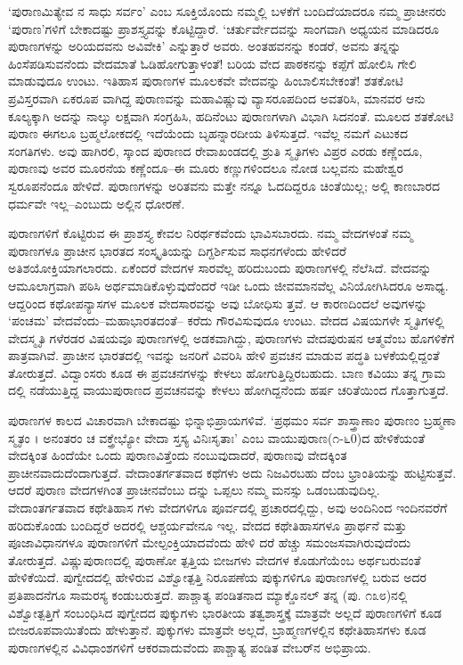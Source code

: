 ‘ಪುರಾಣಮಿತ್ಯೇವ ನ ಸಾಧು ಸರ್ವಂ’ ಎಂಬ ಸೂಕ್ತಿಯೊಂದು ನಮ್ಮಲ್ಲಿ ಬಳಕೆಗೆ ಬಂದಿದೆಯಾದರೂ ನಮ್ಮ ಪ್ರಾಚೀನರು ‘ಪುರಾಣ’ಗಳಿಗೆ ಬೇಕಾದಷ್ಟು ಪ್ರಾಶಸ್ತ್ಯವನ್ನು ಕೊಟ್ಟಿದ್ದಾರೆ. ‘ಚರ್ತುರ್ವೇದವನ್ನು ಸಾಂಗವಾಗಿ ಅಧ್ಯಯನ ಮಾಡಿದರೂ ಪುರಾಣಗಳನ್ನು ಅರಿಯದವನು ಅವಿವೇಕಿ’ ಎನ್ನುತ್ತಾರೆ ಅವರು. ಅಂತಹವನನ್ನು ಕಂಡರೆ, ಅವನು ತನ್ನನ್ನು ಹಿಂಸೆಪಡಿಸುವನೆಂದು ವೇದಮಾತೆ ಓಡಿಹೋಗುತ್ತಾಳಂತೆ! ಬರಿಯ ವೇದ ಪಾಠಕನನ್ನು ಕಪ್ಪೆಗೆ ಹೋಲಿಸಿ ಗೇಲಿ ಮಾಡುವುದೂ ಉಂಟು. ಇತಿಹಾಸ ಪುರಾಣಗಳ ಮೂಲಕವೇ ವೇದವನ್ನು ಹಿಂಬಾಲಿಸಬೇಕಂತೆ! ಶತಕೋಟಿ ಪ್ರವಿಸ್ತರವಾಗಿ ಏಕರೂಪ ವಾಗಿದ್ದ ಪುರಾಣವನ್ನು ಮಹಾವಿಷ್ಣುವು ವ್ಯಾಸರೂಪದಿಂದ ಅವತರಿಸಿ, ಮಾನವರ ಆನು ಕೂಲ್ಯಕ್ಕಾಗಿ ಅದನ್ನು ನಾಲ್ಕು ಲಕ್ಷವಾಗಿ ಸಂಗ್ರಹಿಸಿ, ಹದಿನೆಂಟು ಪುರಾಣಗಳಾಗಿ ವಿಭಾಗಿ ಸಿದನಂತೆ. ಮೂಲದ ಶತಕೋಟಿ ಪುರಾಣ ಈಗಲೂ ಬ್ರಹ್ಮಲೋಕದಲ್ಲಿ ಇದೆಯೆಂದು ಬೃಹನ್ನಾರದೀಯ ತಿಳಿಸುತ್ತದೆ. ಇವೆಲ್ಲ ನಮಗೆ ಎಟುಕದ ಸಂಗತಿಗಳು. ಅವು ಹಾಗಿರಲಿ, ಸ್ಕಾಂದ ಪುರಾಣದ ರೇವಾಖಂಡದಲ್ಲಿ ಶ್ರುತಿ ಸ್ಮೃತಿಗಳು ವಿಪ್ರರ ಎರಡು ಕಣ್ಣೆಂದೂ, ಪುರಾಣವು ಅವರ ಮೂರನೆಯ ಕಣ್ಣೆಂದೂ–ಈ ಮೂರು ಕಣ್ಣುಗಳಿಂದಲೂ ನೋಡ ಬಲ್ಲವನು ಮಹೇಶ್ವರ ಸ್ವರೂಪನೆಂದೂ ಹೇಳಿದೆ. ಪುರಾಣಗಳನ್ನು ಅರಿತವನು ಮತ್ತೇ ನನ್ನೂ ಓದದಿದ್ದರೂ ಚಿಂತೆಯಿಲ್ಲ; ಅಲ್ಲಿ ಕಾಣಬಾರದ ಧರ್ಮವೇ ಇಲ್ಲ–ಎಂಬುದು ಅಲ್ಲಿನ ಧೋರಣೆ.

ಪುರಾಣಗಳಿಗೆ ಕೊಟ್ಟಿರುವ ಈ ಪ್ರಾಶಸ್ತ್ಯ ಕೇವಲ ನಿರರ್ಥಕವೆಂದು ಭಾವಿಸಬಾರದು. ನಮ್ಮ ವೇದಗಳಂತೆ ನಮ್ಮ ಪುರಾಣಗಳೂ ಪ್ರಾಚೀನ ಭಾರತದ ಸಂಸ್ಕೃತಿಯನ್ನು ದಿಗ್ದರ್ಶಿಸುವ ಸಾಧನಗಳೆಂದು ಹೇಳಿದರೆ ಅತಿಶಯೋಕ್ತಿಯಾಗಲಾರದು. ಏಕೆಂದರೆ ವೇದಗಳ ಸಾರವೆಲ್ಲ ಹರಿದುಬಂದು ಪುರಾಣಗಳಲ್ಲಿ ನೆಲೆಸಿದೆ. ವೇದವನ್ನು ಆಮೂಲಾಗ್ರವಾಗಿ ಪಠಿಸಿ ಅರ್ಥಮಾಡಿಕೊಳ್ಳುವುದೆಂದರೆ ಇಡೀ ಒಂದು ಜೀವಮಾನವೆಲ್ಲ ವಿನಿಯೋಗಿಸಿದರೂ ಅಸಾಧ್ಯ. ಆದ್ದರಿಂದ ಕಥೋಪನ್ಯಾಸಗಳ ಮೂಲಕ ವೇದಸಾರವನ್ನು ಅವು ಬೋಧಿಸು ತ್ತವೆ. ಆ ಕಾರಣದಿಂದಲೆ ಅವುಗಳನ್ನು ‘ಪಂಚಮ’ ವೇದವೆಂದು–ಮಹಾಭಾರತದಂತೆ– ಕರೆದು ಗೌರವಿಸುವುದೂ ಉಂಟು. ವೇದದ ವಿಷಯಗಳೇ ಸ್ಮೃತಿಗಳಲ್ಲಿ ವೇದಸ್ಮೃತಿ ಗಳೆರಡರ ವಿಷಯವೂ ಪುರಾಣಗಳಲ್ಲಿ ಅಡಕವಾಗಿದ್ದು, ಪುರಾಣಗಳು ವೇದಪುರುಷನ ಆತ್ಮವೆಂಬ ಹೊಗಳಿಕೆಗೆ ಪಾತ್ರವಾಗಿವೆ. ಪ್ರಾಚೀನ ಭಾರತದಲ್ಲಿ ಇವನ್ನು ಜನರಿಗೆ ವಿವರಿಸಿ ಹೇಳಿ ಪ್ರವಚನ ಮಾಡುವ ಪದ್ಧತಿ ಬಳಕೆಯಲ್ಲಿದ್ದಂತೆ ತೋರುತ್ತದೆ. ವಿದ್ವಾಂಸರು ಕೂಡ ಈ ಪ್ರವಚನಗಳನ್ನು ಕೇಳಲು ಹೋಗುತ್ತಿದ್ದಿರಬಹುದು. ಬಾಣ ಕವಿಯು ತನ್ನ ಗ್ರಾಮ ದಲ್ಲಿ ನಡೆಯುತ್ತಿದ್ದ ವಾಯುಪುರಾಣದ ಪ್ರವಚನವನ್ನು ಕೇಳಲು ಹೋಗಿದ್ದನೆಂದು ಹರ್ಷ ಚರಿತೆಯಿಂದ ಗೊತ್ತಾಗುತ್ತದೆ.

ಪುರಾಣಗಳ ಕಾಲದ ವಿಚಾರವಾಗಿ ಬೇಕಾದಷ್ಟು ಭಿನ್ನಾಭಿಪ್ರಾಯಗಳಿವೆ. ‘ಪ್ರಥಮಂ ಸರ್ವ ಶಾಸ್ತ್ರಾಣಾಂ ಪುರಾಣಂ ಬ್ರಹ್ಮಣಾ ಸ್ಮೃತಂ । ಅನಂತರಂ ಚ ವಕ್ತ್ರೇಭ್ಯೋ ವೇದಾ ಸ್ತಸ್ಯ ವಿನಿಃಸೃತಾಃ’ ಎಂಬ ವಾಯುಪುರಾಣ(೧-೬0)ದ ಹೇಳಿಕೆಯಂತೆ ವೇದಕ್ಕಿಂತ ಹಿಂದೆಯೇ ಒಂದು ಪುರಾಣವಿತ್ತೆಂದು ನಂಬುವುದಾದರೆ, ಪುರಾಣವು ವೇದಕ್ಕಿಂತ ಪ್ರಾಚೀನವಾದುದೆಂದಾಗುತ್ತದೆ. ವೇದಾಂತರ್ಗತವಾದ ಕಥೆಗಳು ಅದು ನಿಜವಿರಬಹು ದೆಂಬ ಭ್ರಾಂತಿಯನ್ನು ಹುಟ್ಟಿಸುತ್ತವೆ. ಆದರೆ ಪುರಾಣ ವೇದಗಳಗಿಂತ ಪ್ರಾಚೀನವೆಂಬು ದನ್ನು ಒಪ್ಪಲು ನಮ್ಮ ಮನಸ್ಸು ಒಡಂಬಡುವುದಿಲ್ಲ. ವೇದಾಂತರ್ಗತವಾದ ಕಥೇತಿಹಾಸ ಗಳು ವೇದಗಳಿಗೂ ಪೂರ್ವದಲ್ಲಿ ಪ್ರಚಾರದಲ್ಲಿದ್ದು, ಅವು ಅಂದಿನಿಂದ ಇಂದಿನವರೆಗೆ ಹರಿದುಕೊಂಡು ಬಂದಿದ್ದರೆ ಅದರಲ್ಲಿ ಆಶ್ಚರ್ಯವೇನೂ ಇಲ್ಲ. ವೇದದ ಕಥೇತಿಹಾಸಗಳೂ ಪ್ರಾರ್ಥನೆ ಮತ್ತು ಪೂಜಾವಿಧಾನಗಳೂ ಪುರಾಣಗಳಿಗೆ ಮೇಲ್ಪಂಕ್ತಿಯಾದವೆಂದು ಹೇಳಿ ದರೆ ಹೆಚ್ಚು ಸಮಂಜಸವಾಗಿರುವುದೆಂದು ತೋರುತ್ತದೆ. ವಿಷ್ಣುಪುರಾಣದಲ್ಲಿ ಪುರಾಣೋ ತ್ಪತ್ತಿಯ ಬೀಜಗಳು ವೇದಗಳ ಕೊಡುಗೆಯೆಂಬ ಅರ್ಥಬರುವಂತೆ ಹೇಳಿಕೆಯಿದೆ. ಪುಗ್ವೇದದಲ್ಲಿ ಹೇಳಿರುವ ವಿಶ್ವೋತ್ಪತ್ತಿ ನಿರೂಪಣೆಯ ಪುಕ್ಕುಗಳಿಗೂ ಪುರಾಣಗಳಲ್ಲಿ ಬರುವ ಅದರ ಪ್ರತಿಪಾದನೆಗೂ ಸಾಮರಸ್ಯ ಕಂಡುಬರುತ್ತದೆ. ಪಾಶ್ಚಾತ್ಯ ಪಂಡಿತನಾದ ಮ್ಯಾಕ್ಡೊನಲ್ ತನ್ನ  (ಪು. ೧೩೮)ನಲ್ಲಿ ವಿಶ್ವೋತ್ಪತ್ತಿಗೆ ಸಂಬಂಧಿಸಿದ ಪುಗ್ವೇದದ ಪುಕ್ಕುಗಳು ಭಾರತೀಯ ತತ್ವಶಾಸ್ತ್ರಕ್ಕೆ ಮಾತ್ರವೇ ಅಲ್ಲದೆ ಪುರಾಣಗಳಿಗೆ ಕೂಡ ಬೀಜರೂಪವಾಯಿತೆಂದು ಹೇಳುತ್ತಾನೆ. ಪುಕ್ಕುಗಳು ಮಾತ್ರವೇ ಅಲ್ಲದೆ, ಬ್ರಾಹ್ಮಣಗಳಲ್ಲಿನ ಕಥೇತಿಹಾಸಗಳು ಕೂಡ ಪುರಾಣಗಳಲ್ಲಿನ ವಿವಿಧಾಂಶಗಳಿಗೆ ಆಕರವಾದುವೆಂದು ಪಾಶ್ಚಾತ್ಯ ಪಂಡಿತ ವೇಬರ್​ನ ಅಭಿಪ್ರಾಯ.

